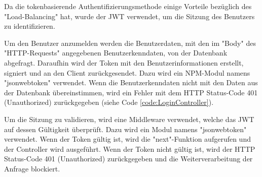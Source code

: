 
Da die tokenbasierende Authentifizierungsmethode einige Vorteile bezüglich des "Load-Balancing" hat, wurde der JWT verwendet, um die Sitzung des Benutzers zu identifizieren.


Um den Benutzer anzumelden werden die Benutzerdaten, mit den im "Body" des "HTTP-Requests" angegebenen Benutzerkenndaten, von der Datenbank abgefragt. Daraufhin wird der Token mit den Benutzerinformationen erstellt, signiert und an den Client zurückgesendet. Dazu wird ein NPM-Modul namens "jsonwebtoken" verwendet. \cite{NpmJWT} Wenn die Benutzerkenndaten nicht mit den Daten aus der Datenbank übereinstimmen, wird ein Fehler mit dem HTTP Status-Code 401 (Unauthorized) zurückgegeben (siehe Code \ref{code:LoginController}).


\pagebreak
{}

Um die Sitzung zu validieren, wird eine Middleware verwendet, welche das JWT auf dessen Gültigkeit überprüft. Dazu wird ein Modul namens "jsonwebtoken" verwendet. \cite{NpmJWT} Wenn der Token gültig ist, wird die "next"-Funktion aufgerufen und der Controller wird ausgeführt. Wenn der Token nicht gültig ist, wird der HTTP Status-Code 401 (Unauthorized) zurückgegeben und die Weiterverarbeitung der Anfrage blockiert.

